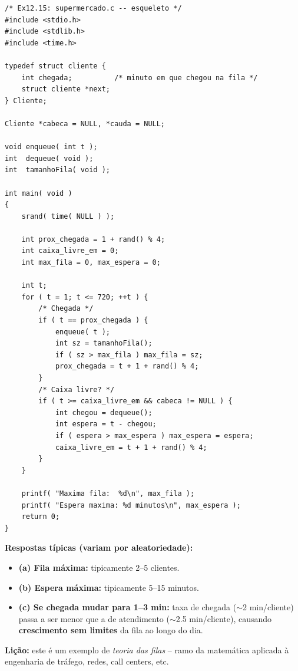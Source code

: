 \documentclass[12pt,a4paper]{article}
\begin{document}
\begin{respostabox}
\begin{lstlisting}
/* Ex12.15: supermercado.c -- esqueleto */
#include <stdio.h>
#include <stdlib.h>
#include <time.h>

typedef struct cliente {
    int chegada;          /* minuto em que chegou na fila */
    struct cliente *next;
} Cliente;

Cliente *cabeca = NULL, *cauda = NULL;

void enqueue( int t );
int  dequeue( void );
int  tamanhoFila( void );

int main( void )
{
    srand( time( NULL ) );

    int prox_chegada = 1 + rand() % 4;
    int caixa_livre_em = 0;
    int max_fila = 0, max_espera = 0;

    int t;
    for ( t = 1; t <= 720; ++t ) {
        /* Chegada */
        if ( t == prox_chegada ) {
            enqueue( t );
            int sz = tamanhoFila();
            if ( sz > max_fila ) max_fila = sz;
            prox_chegada = t + 1 + rand() % 4;
        }
        /* Caixa livre? */
        if ( t >= caixa_livre_em && cabeca != NULL ) {
            int chegou = dequeue();
            int espera = t - chegou;
            if ( espera > max_espera ) max_espera = espera;
            caixa_livre_em = t + 1 + rand() % 4;
        }
    }

    printf( "Maxima fila:  %d\n", max_fila );
    printf( "Espera maxima: %d minutos\n", max_espera );
    return 0;
}
\end{lstlisting}

\textbf{Respostas típicas (variam por aleatoriedade):}
\begin{itemize}[noitemsep]
  \item \textbf{(a) Fila máxima:} tipicamente 2--5 clientes.
  \item \textbf{(b) Espera máxima:} tipicamente 5--15 minutos.
  \item \textbf{(c) Se chegada mudar para 1--3 min:} taxa de chegada ($\sim$2 min/cliente)
  passa a ser menor que a de atendimento ($\sim$2.5 min/cliente), causando
  \textbf{crescimento sem limites} da fila ao longo do dia.
\end{itemize}

\textbf{Lição:} este é um exemplo de \textit{teoria das filas} -- ramo da matemática
aplicada à engenharia de tráfego, redes, call centers, etc.
\end{respostabox}

\end{document}
